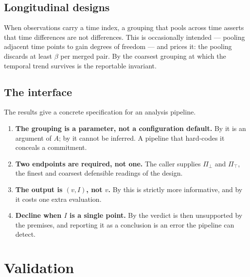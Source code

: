 \documentclass[11pt,a4paper]{article}
\theoremstyle{definition}
\theoremstyle{remark}
\newcommand{\flo}{\beta}
\newcommand{\Part}{\Pi}                      %
\begin{document}
\subsection{Longitudinal designs}

When observations carry a time index, a grouping that pools across time
asserts that time differences are not differences. This is occasionally
intended --- pooling adjacent time points to gain degrees of freedom ---
and  prices it: the pooling discards at least $\flo$
per merged pair. By  the coarsest grouping
at which the temporal trend survives is the reportable invariant.

\subsection{The interface}

The results give a concrete specification for an analysis pipeline.

\begin{enumerate}[label=(\roman*)]
\item \textbf{The grouping is a parameter, not a configuration default.}
By  it is an argument of $A$; by
 it cannot be inferred. A pipeline that hard-codes
it conceals a commitment.

\item \textbf{Two endpoints are required, not one.} The caller supplies
$\Part_{\bot}$ and $\Part_{\top}$, the finest and coarsest defensible
readings of the design.

\item \textbf{The output is $(v,I)$, not $v$.} By
 this is strictly more informative, and by
 it costs one extra evaluation.

\item \textbf{Decline when $I$ is a single point.} By
 the verdict is then unsupported by the premises,
and reporting it as a conclusion is an error the pipeline can detect.
\end{enumerate}

\section{Validation}
\label{sec:validation}
\end{document}
